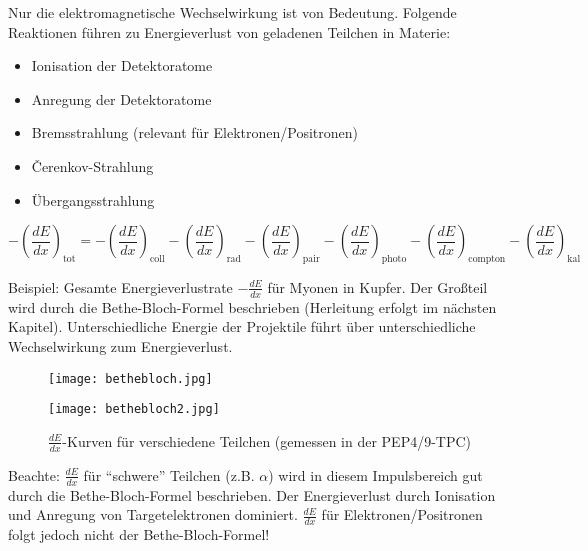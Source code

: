 Nur die elektromagnetische Wechselwirkung ist von Bedeutung. Folgende Reaktionen führen zu
Energieverlust von geladenen Teilchen in Materie:

\begin{itemize}
  \item Ionisation der Detektoratome
  \item Anregung der Detektoratome
  \item Bremsstrahlung (relevant für Elektronen/Positronen)
  \item \v{C}erenkov-Strahlung
  \item Übergangsstrahlung
\end{itemize}

\[-\left(\frac{dE}{dx}\right)_{\text{tot}} = -\left(\frac{dE}{dx}\right)_{\text{coll}}
-\left(\frac{dE}{dx}\right)_{\text{rad}} -\left(\frac{dE}{dx}\right)_{\text{pair}}
-\left(\frac{dE}{dx}\right)_{\text{photo}} -\left(\frac{dE}{dx}\right)_{\text{compton}}
-\left(\frac{dE}{dx}\right)_{\text{kal}}\]
 
Beispiel: Gesamte Energieverlustrate $-\frac{dE}{dx}$ für Myonen in Kupfer. Der
Großteil wird durch die Bethe-Bloch-Formel beschrieben (Herleitung erfolgt im nächsten Kapitel).
Unterschiedliche Energie der Projektile führt über unterschiedliche Wechselwirkung zum
Energieverlust.

\begin{figure}[H]
	\centering
	\texttt{[image: bethebloch.jpg]}
\end{figure}

\begin{figure}[H]
	\centering
	\texttt{[image: bethebloch2.jpg]}
	\caption{$\frac{dE}{dx}$-Kurven für verschiedene Teilchen (gemessen in der
	PEP4/9-TPC)}
	\label{}
\end{figure}
 
 Beachte: $\frac{dE}{dx}$ für "`schwere"' Teilchen (z.B. $\alpha$) wird in diesem Impulsbereich gut
 durch die Bethe-Bloch-Formel beschrieben. Der Energieverlust durch Ionisation und Anregung von
 Targetelektronen dominiert. $\frac{dE}{dx}$ für Elektronen/Positronen folgt jedoch nicht der
 Bethe-Bloch-Formel!